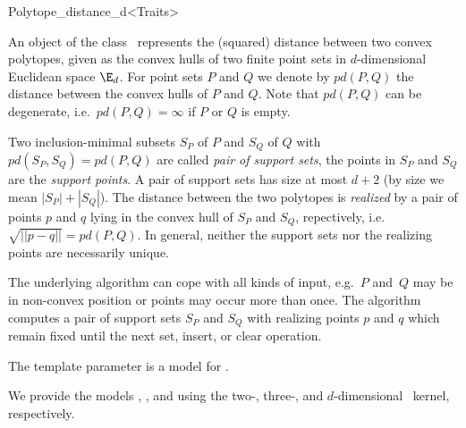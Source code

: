 
\begin{ccRefClass}{Polytope_distance_d<Traits>}


\ccSaveThreeColumns
\cgalPolytopeDistanceLayout

\newcommand{\PDempty}{%
  $pd(\mbox{\ccTexHtml{$\emptyset$}{&Oslash;}},%
      \mbox{\ccTexHtml{$\emptyset$}{&Oslash;}})$}

\ccDefinition

An object of the class \ccRefName\ represents the (squared) distance
between two convex polytopes, given as the convex hulls of two finite point
sets in $d$-dimensional Euclidean space $\E_d$. For point sets $P$ and $Q$
we denote by $pd(P,Q)$ the distance between the convex hulls of $P$ and
$Q$. Note that $pd(P,Q)$ can be
degenerate,
i.e.~$pd(P,Q)=\infty$ if $P$ or $Q$ is empty.

Two inclusion-minimal subsets $S_P$ of $P$ and $S_Q$ of $Q$ with
$pd(S_P,S_Q)=pd(P,Q)$ are called \emph{pair of support
  sets}, the
points in $S_P$ and $S_Q$ are the \emph{support points}. A pair of support
sets has size at most $d+2$ (by size we mean $|S_P|+|S_Q|$). The distance
between the two polytopes is \emph{realized} by a pair of points $p$ and
$q$ lying in the convex hull of $S_P$ and $S_Q$, repectively,
i.e.~$\sqrt{||p-q||}=pd(P,Q)$. In general, neither the support sets nor the
realizing points are necessarily unique.

The underlying algorithm can cope with all kinds of input, e.g.~$P$ and~$Q$
may be in non-convex position or points may occur more than once. The
algorithm computes a pair of support sets $S_P$ and $S_Q$ with realizing
points $p$ and $q$ which remain fixed until the next set, insert, or clear
operation.


\ccRequirements
\ccIndexRequirements

The template parameter  is a model for .

We provide the models ,
, and  using the
two-, three-, and $d$-dimensional \cgal~kernel, respectively.


\end{ccRefClass}
